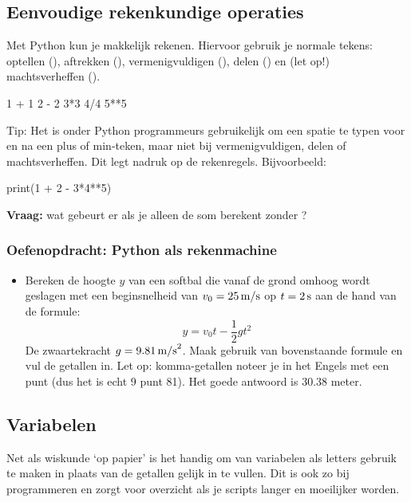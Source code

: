 \documentclass[a4paper,11pt, fleqn]{article}
\begin{document}
\subsection{Eenvoudige rekenkundige operaties}
Met Python kun je makkelijk rekenen. Hiervoor gebruik je normale tekens: optellen (\pythoninline{+}), aftrekken (\pythoninline{-}), vermenigvuldigen (\pythoninline{*}), delen (\pythoninline{/}) en (let op!) machtsverheffen (\pythoninline{**}).

\begin{python}
1 + 1
2 - 2
3*3
4/4
5**5
\end{python}

Tip: Het is onder Python programmeurs gebruikelijk om een spatie te typen voor en na een plus of min-teken, maar niet bij vermenigvuldigen, delen of machtsverheffen. Dit legt nadruk op de rekenregels. Bijvoorbeeld: 

\begin{python}
print(1 + 2 - 3*4**5)
\end{python}
\textbf{Vraag:} wat gebeurt er als je alleen de som berekent zonder ?

\subsubsection*{Oefenopdracht: Python als rekenmachine} 
\begin{itemize}
	\item Bereken de hoogte $y$ van een softbal die vanaf de grond omhoog wordt geslagen met een beginsnelheid van $v_0 = 25 \, {\rm m/s}$ op $t = 2 \, {\rm s}$ aan de hand van de formule:
	\begin{equation}
	y = v_0 t - \frac{1}{2}g t^2
	\end{equation}
	De zwaartekracht $g = 9.81 \, {\rm m/s}^2$. Maak gebruik van bovenstaande formule en vul de getallen in. Let op: komma-getallen noteer je in het Engels met een punt (dus het is echt 9 punt 81). Het goede antwoord is 30.38 meter.
\end{itemize}


\subsection{Variabelen}
Net als wiskunde `op papier' is het handig om van variabelen als letters gebruik te maken in plaats van de getallen gelijk in te vullen. Dit is ook zo bij programmeren en zorgt voor overzicht als je scripts langer en moeilijker worden.
\end{document}
